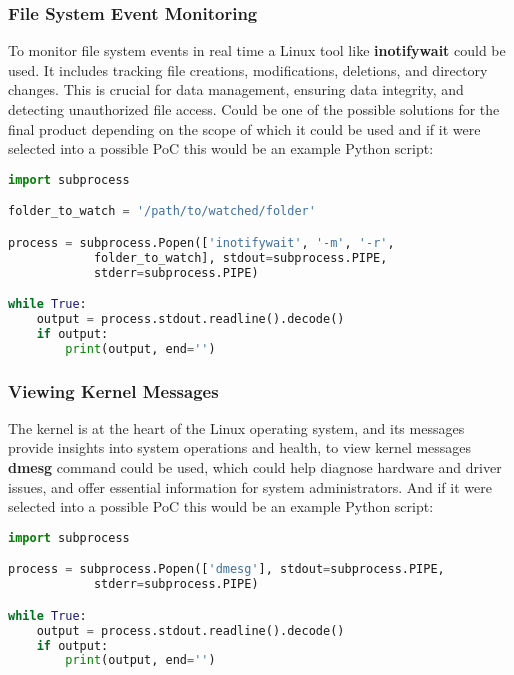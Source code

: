 \documentclass{VUMIFPSmagistrinis}
\begin{document}
\subsubsection{File System Event Monitoring}
To monitor file system events in real time a Linux tool like \textbf{inotifywait} could be used. It includes tracking file creations, modifications, deletions, and directory changes. This is crucial for data management, ensuring data integrity, and detecting unauthorized file access. Could be one of the possible solutions for the final product depending on the scope of which it could be used and if it were selected into a possible PoC this would be an example Python script:
\begin{lstlisting}[language=Python]
import subprocess

folder_to_watch = '/path/to/watched/folder'

process = subprocess.Popen(['inotifywait', '-m', '-r', 
            folder_to_watch], stdout=subprocess.PIPE, 
            stderr=subprocess.PIPE)

while True:
    output = process.stdout.readline().decode()
    if output:
        print(output, end='')
\end{lstlisting}

\subsubsection{Viewing Kernel Messages}
The kernel is at the heart of the Linux operating system, and its messages provide insights into system operations and health, to view kernel messages \textbf{dmesg} command could be used, which could help diagnose hardware and driver issues, and offer essential information for system administrators. And if it were selected into a possible PoC this would be an example Python script:
\begin{lstlisting}[language=Python]
import subprocess

process = subprocess.Popen(['dmesg'], stdout=subprocess.PIPE, 
            stderr=subprocess.PIPE)

while True:
    output = process.stdout.readline().decode()
    if output:
        print(output, end='')
\end{lstlisting}
\end{document}
